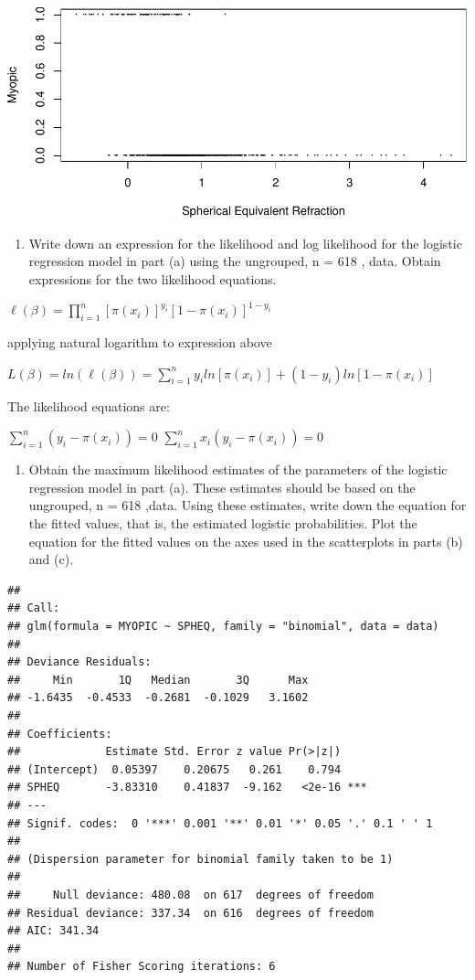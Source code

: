 \documentclass[]{article}
\begin{document}
\begin{center}\includegraphics{HomeworkWeek1_files/figure-latex/unnamed-chunk-1-1} \end{center}

\begin{enumerate}
\def\labelenumi{\alph{enumi}.}
\setcounter{enumi}{2}
\itemsep1pt\parskip0pt
\item
  Write down an expression for the likelihood and log likelihood for the
  logistic regression model in part (a) using the ungrouped, n = 618 ,
  data. Obtain expressions for the two likelihood equations.
\end{enumerate}

$\ell(\beta)=\prod_{i=1}^{n}[\pi(x_i)]^{y_i}[1-\pi(x_i)]^{1-y_i}$

applying natural logarithm to expression above

$L(\beta)=ln(\ell(\beta))=\sum_{i=1}^{n}y_iln[\pi(x_i)]+(1-y_i)ln[1-\pi(x_i)]$

The likelihood equations are:

$\sum_{i=1}^{n}(y_i-\pi(x_i))=0$ $\sum_{i=1}^{n}x_i(y_i-\pi(x_i))=0$

\begin{enumerate}
\def\labelenumi{\alph{enumi}.}
\setcounter{enumi}{3}
\itemsep1pt\parskip0pt
\item
  Obtain the maximum likelihood estimates of the parameters of the
  logistic regression model in part (a). These estimates should be based
  on the ungrouped, n = 618 ,data. Using these estimates, write down the
  equation for the fitted values, that is, the estimated logistic
  probabilities. Plot the equation for the fitted values on the axes
  used in the scatterplots in parts (b) and (c).
\end{enumerate}

\begin{verbatim}
## 
## Call:
## glm(formula = MYOPIC ~ SPHEQ, family = "binomial", data = data)
## 
## Deviance Residuals: 
##     Min       1Q   Median       3Q      Max  
## -1.6435  -0.4533  -0.2681  -0.1029   3.1602  
## 
## Coefficients:
##             Estimate Std. Error z value Pr(>|z|)    
## (Intercept)  0.05397    0.20675   0.261    0.794    
## SPHEQ       -3.83310    0.41837  -9.162   <2e-16 ***
## ---
## Signif. codes:  0 '***' 0.001 '**' 0.01 '*' 0.05 '.' 0.1 ' ' 1
## 
## (Dispersion parameter for binomial family taken to be 1)
## 
##     Null deviance: 480.08  on 617  degrees of freedom
## Residual deviance: 337.34  on 616  degrees of freedom
## AIC: 341.34
## 
## Number of Fisher Scoring iterations: 6
\end{verbatim}
\end{document}
